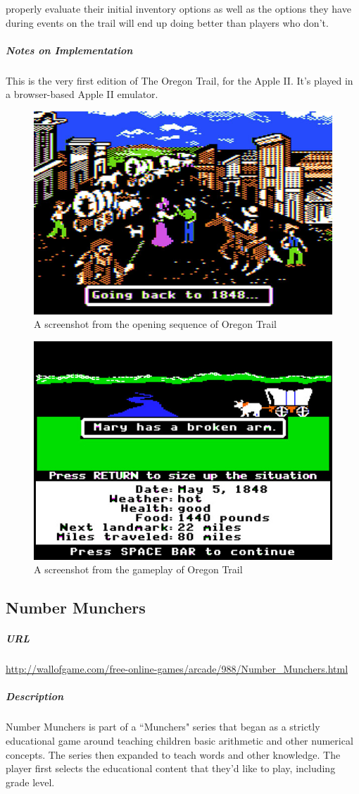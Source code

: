 properly evaluate their initial inventory options as well as the options they have during events on the trail will end up doing better than players who don't.\subparagraph{Notes on Implementation}This is the very first edition of The Oregon Trail, for the Apple II. It's played in a browser-based Apple II emulator.\begin{figure}[p]\centering \includegraphics[height=.4\textheight, width=\textwidth, keepaspectratio=true]{img/oregon_title.jpg}\caption{A screenshot from the opening sequence of Oregon Trail}\end{figure}\begin{figure}[p]\centering \includegraphics[height=.4\textheight, width=\textwidth, keepaspectratio=true]{img/oregon_screen.jpg}\caption{A screenshot from the gameplay of Oregon Trail}\end{figure}\subsection{Number Munchers}\subparagraph{URL}\url{http://wallofgame.com/free-online-games/arcade/988/Number_Munchers.html}\subparagraph{Description}Number Munchers is part of a ``Munchers" series that began as a strictly educational game around teaching children basic arithmetic and other numerical concepts. The series then expanded to teach words and other knowledge. The player first selects the educational content that they'd like to play, including grade level. 